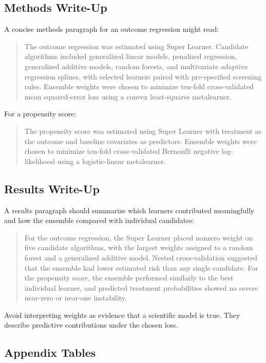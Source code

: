 \subsection{Methods Write-Up}

A concise methods paragraph for an outcome regression might read:

\begin{quote}
The outcome regression was estimated using Super Learner. Candidate algorithms
included generalized linear models, penalized regression, generalized additive models,
random forests, and multivariate adaptive regression splines, with selected learners
paired with pre-specified screening rules. Ensemble weights were chosen to minimize
ten-fold cross-validated mean squared-error loss using a convex least-squares
metalearner.
\end{quote}

For a propensity score:

\begin{quote}
The propensity score was estimated using Super Learner with treatment as the outcome
and baseline covariates as predictors. Ensemble weights were chosen to minimize
ten-fold cross-validated Bernoulli negative log-likelihood using a logistic-linear
metalearner.
\end{quote}

\subsection{Results Write-Up}

A results paragraph should summarize which learners contributed meaningfully and how
the ensemble compared with individual candidates:

\begin{quote}
For the outcome regression, the Super Learner placed nonzero weight on five
candidate algorithms, with the largest weights assigned to a random forest and a
generalized additive model. Nested cross-validation suggested that the ensemble had
lower estimated risk than any single candidate. For the propensity score, the ensemble
performed similarly to the best individual learner, and predicted treatment
probabilities showed no severe near-zero or near-one instability.
\end{quote}

Avoid interpreting weights as evidence that a scientific model is true. They describe
predictive contributions under the chosen loss.

\subsection{Appendix Tables}

